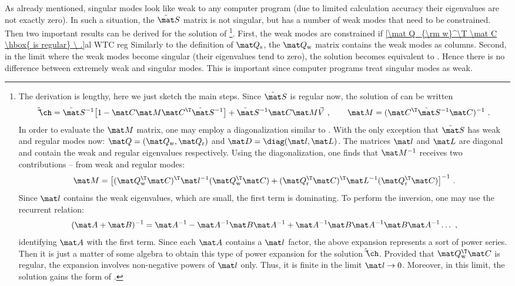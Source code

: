 As already mentioned, singular modes look like weak to any computer program (due to limited calculation accuracy their eigenvalues are not exactly zero). In such a situation, the $\tilde\mat S$ matrix is not singular, but has a number of weak modes that need to be constrained. Then two important results can be derived for the solution of  \footnote{%
The derivation is lengthy, here we just sketch the main steps. Since $\tilde\mat S$ is regular now, the solution of  can be written
$$
	\hat\vec\ch = \tilde\mat S^{-1} \big[ 1 - \mat C \mat M \mat C^\T \tilde\mat S^{-1} \big]
		+ \tilde\mat S^{-1} \mat C \mat M \vec V\ ,\qquad
	\mat M = (\mat C^\T \tilde\mat S^{-1} \mat C)^{-1}\ .
$$
In order to evaluate the $\mat M$ matrix, one may employ a diagonalization similar to . With the only exception that $\tilde\mat S$ has weak and regular modes now: $\mat Q = (\mat Q_{\rm w}, \mat Q_{\rm r})$ and $\mat D = \diag(\mat l, \mat L)$. The matrices $\mat l$ and $\mat L$ are diagonal and contain the weak and regular eigenvalues respectively. Using the diagonalization, one finds that $\mat M^{-1}$ receives two contributions -- from weak and regular modes:
$$ \mat M = \big[
	(\mat Q_{\rm w}^\T \mat C)^\T \mat l^{-1} (\mat Q_{\rm w}^\T \mat C)
	+ (\mat Q_{\rm r}^\T \mat C)^\T \mat L^{-1} (\mat Q_{\rm r}^\T \mat C)
\big]^{-1}\ .$$
Since $\mat l$ contains the weak eigenvalues, which are small, the first term is dominating. To perform the inversion, one may use the recurrent relation:
$$(\mat A+\mat B)^{-1} = \mat A^{-1} - \mat A^{-1} \mat B \mat A^{-1} + \mat A^{-1} \mat B \mat A^{-1} \mat B \mat A^{-1} \ldots\ ,$$
identifying $\mat A$ with the first term. Since each $\mat A$ contains a $\mat l$ factor, the above expansion represents a sort of power series. Then it is just a matter of some algebra to obtain this type of power expansion for the solution $\hat\vec\ch$. Provided that $\mat Q_{\rm w}^\T \mat C$ is regular, the expansion involves non-negative powers of $\mat l$ only. Thus, it is finite in the limit $\mat l\to 0$. Moreover, in this limit, the solution gains the form of .
}.
First, the weak modes are constrained if
\eqref{\mat Q_{\rm w}^\T \mat C \hbox{ is regular} \ .}{al WTC reg}
Similarly to the definition of $\mat Q_{\rm s}$, the $\mat Q_{\rm w}$ matrix contains the weak modes as columns.
Second, in the limit where the weak modes become singular (their eigenvalues tend to zero), the solution becomes equivalent to . Hence there is no difference between extremely weak and singular modes. This is important since computer programs treat singular modes as weak.

